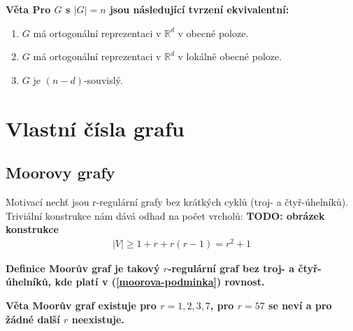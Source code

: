 \documentclass[a4paper,12pt,titlepage]{article}
\newcommand{\df}{\smallskip\noindent\bf Definice\rm{} }
\newcommand{\vt}{\smallskip\noindent\bf Věta\rm{} }
\newcommand{\R}{\mathbb{R}}
\newcommand{\todo}[1]{\bf TODO: \rm#1}
\begin{document}
\vt Pro $G$ s $|G| = n$ jsou následující tvrzení ekvivalentní:
\begin{enumerate}
	\item $G$ má ortogonální reprezentaci v $\R^d$ v obecné poloze.
	\item $G$ má ortogonální reprezentaci v $\R^d$ v lokálně obecné poloze.
	\item $G$ je $(n-d)$-souvislý.
\end{enumerate}


\section{Vlastní čísla grafu}
\subsection{Moorovy grafy}
Motivací nechť jsou r-regulární grafy bez krátkých cyklů (troj- a 
čtyř-úhelníků). Triviální konstrukce nám dává odhad na počet vrcholů:
\todo{obrázek konstrukce}
\begin{align}
\label{moorova-podminka}
	|V| \geq 1 + r + r(r-1) = r^2 +1
\end{align}

\df Moorův graf je takový $r$-regulární graf bez troj- a čtyř-úhelníků, kde 
platí v (\ref{moorova-podminka}) rovnost.

\vt Moorův graf existuje pro $r=1,2,3,7$, pro $r=57$ se neví a pro žádné další 
$r$ neexistuje.
\end{document}
